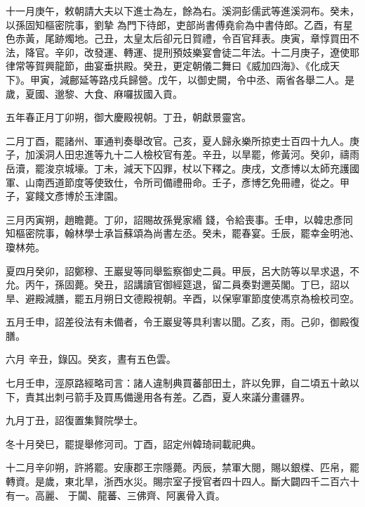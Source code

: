 \begin{pinyinscope}
 十一月庚午，敕朝請大夫以下進士為左，餘為右。溪洞彭儒武等進溪洞布。癸未，以孫固知樞密院事，劉摯
 為門下待郎，吏部尚書傅堯俞為中書侍郎。乙酉，有星色赤黃，尾跡燭地。己丑，太皇太后卻元日賀禮，令百官拜表。庚寅，章惇買田不法，降官。辛卯，改發運、轉運、提刑預妓樂宴會徒二年法。十二月庚子，遼使耶律常等賀興龍節，曲宴垂拱殿。癸丑，更定朝儀二舞曰《威加四海》、《化成天下》。甲寅，減鄜延等路戍兵歸營。戊午，以御史闕，令中丞、兩省各舉二人。是歲，夏國、邈黎、大食、麻囉拔國入貢。



 五年春正月丁卯朔，御大慶殿視朝。丁丑，朝獻景靈宮。



 二月丁酉，罷諸州、軍通判奏舉改官。己亥，夏人歸永樂所掠吏士百四十九人。庚子，加溪洞人田忠進等九十二人檢校官有差。辛丑，以旱罷，修黃河。癸卯，禱雨岳瀆，罷浚京城壕。丁未，減天下囚罪，杖以下釋之。庚戌，文彥博以太師充護國軍、山南西道節度等使致仕，令所司備禮冊命。壬子，彥博乞免冊禮，從之。甲子，宴餞文彥博於玉津園。



 三月丙寅朔，趙瞻薨。丁卯，詔賜故孫覺家緡
 錢，令給喪事。壬申，以韓忠彥同知樞密院事，翰林學士承旨蘇頌為尚書左丞。癸未，罷春宴。壬辰，罷幸金明池、瓊林苑。



 夏四月癸卯，詔鄭穆、王巖叟等同舉監察御史二員。甲辰，呂大防等以旱求退，不允。丙午，孫固薨。癸丑，詔講讀官御經筵退，留二員奏對邇英閣。丁巳，詔以旱、避殿減膳，罷五月朔日文德殿視朝。辛酉，以保寧軍節度使馮京為檢校司空。



 五月壬申，詔差役法有未備者，令王巖叟等具利害以聞。乙亥，雨。己卯，御殿復膳。



 六月
 辛丑，錄囚。癸亥，晝有五色雲。



 七月壬申，涇原路經略司言：諸人違制典買蕃部田土，許以免罪，自二頃五十畝以下，責其出刺弓箭手及買馬備邊用各有差。乙酉，夏人來議分畫疆界。



 九月丁丑，詔復置集賢院學士。



 冬十月癸巳，罷提舉修河司。丁酉，詔定州韓琦祠載祀典。



 十二月辛卯朔，許將罷。安康郡王宗隱薨。丙辰，禁軍大閱，賜以銀楪、匹帛，罷轉資。是歲，東北旱，浙西水災。賜宗室子授官者四十四人。斷大闢四千二百六十有一。高麗、
 于闐、龍蕃、三佛齊、阿裏骨入貢。




\end{pinyinscope}
